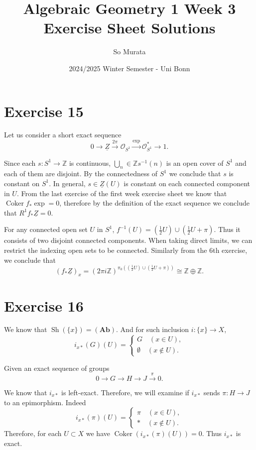 \documentclass{article}
\title{Algebraic Geometry 1 Week 3 Exercise Sheet Solutions}
\author{So Murata}
\date{2024/2025 Winter Semester - Uni Bonn}
\DeclareMathOperator{\Coker}{Coker}
\DeclareMathOperator{\Sh}{Sh}
\begin{document}
\maketitle

\section*{Exercise 15}

Let us consider a short exact sequence
\begin{equation*}
0\to\underline{Z}\overset{2\pi}{\to}\mathcal{O}_{S^1}\overset{\exp}{\to}\mathcal{O}^*_{S^1}\to1.
\end{equation*}

Since each $s:S^1\to\mathbb{Z}$ is continuous, $\bigcup_{n}\in\mathbb{Z}s^{-1}(n)$ is an open cover of $S^1$ and each of them are disjoint. By the connectedness of $S^1$ we conclude that $s$ is constant on $S^1$. In general, $s\in\underline{Z}(U)$ is constant on each connected component in $U$. From the last exercise of the first week exercise sheet we know that $\Coker f_*\exp=0$, therefore by the definition of the exact sequence we conclude that $R^1f_*\underline{Z}=0$.  

For any connected open set $U$ in $S^1$, $f^{-1}(U) = \left({\frac 1 2}U\right)\cup\left({\frac 1 2}U+\pi\right)$. Thus it consists of two disjoint connected components. When taking direct limits, we can restrict the indexing open sets to be connected. Similarly from the 6th exercise, we conclude that 
\begin{equation*}
(f_*\underline{Z})_x = (2\pi i\mathbb{Z})^{\pi_0(\left({\frac 1 2}U\right)\cup\left({\frac 1 2}U+\pi\right))} \cong \mathbb{Z}\oplus\mathbb{Z}.
\end{equation*}
\section*{Exercise 16}

We know that $\Sh(\{x\})=(\mathbf{Ab})$. And for such inclusion $i:\{x\}\to X$, 
\begin{equation*}
i_{x*}(G)(U) = 
\begin{cases}
G\quad (x\in U),\\
\emptyset \quad(x\not\in U).
\end{cases}
\end{equation*}

Given an exact sequence of groups
\begin{equation*}
0\to G\to H\to J\overset{\pi}{\to} 0.
\end{equation*}

We know that $i_{x*}$ is left-exact. Therefore, we will examine if $i_{x*}$ sends $\pi:H\to J$ to an epimorphism. Indeed
\begin{equation*}
i_{x*}(\pi)(U) = 
\begin{cases}
\pi \quad(x\in U),\\
*\quad(x\not\in U).
\end{cases}
\end{equation*}
Therefore, for each $U\subset X$ we have $\Coker(i_{x*}(\pi)(U))=0$. Thus $i_{x*}$ is exact.
\end{document}

